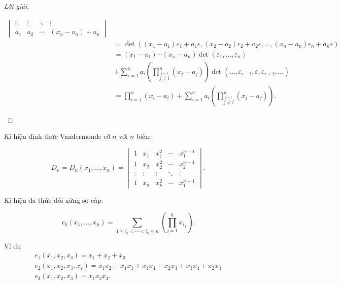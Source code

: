 \documentclass[class=nhvh-linear-algebra,crop=false]{standalone}
\begin{document}
\begin{proof}[Lời giải]
\begin{enumerate}[label = (\alph*)]
\begin{align*}
\begin{vmatrix}
				      \vdots                  & \vdots                  & \ddots & \vdots                  \\
				      a_{1}                   & a_{2}                   & \cdots & (x_{n} - a_{n}) + a_{n}
			      \end{vmatrix}                                                                                       \\
			       & = \det((x_{1} - a_{1})\varepsilon_{1} + a_{1}\varepsilon, (x_{2} - a_{2})\varepsilon_{2} + a_{2}\varepsilon, \ldots, (x_{n} - a_{n})\varepsilon_{n} + a_{n}\varepsilon) \\
			       & = (x_{1} - a_{1})\cdots (x_{n} - a_{n})\det(\varepsilon_{1}, \ldots, \varepsilon_{n})                                                                                   \\
			       & + \sum^{n}_{i = 1}a_{i}\left(\prod^{n}_{\stackrel{j=1}{j\ne i}}(x_{j} - a_{j})\right)\det(\ldots, \varepsilon_{i-1}, \varepsilon, \varepsilon_{i+1}, \ldots)            \\
			       & = \prod^{n}_{i=1}(x_{i} - a_{i}) + \sum^{n}_{i=1}a_{i}\left(\prod^{n}_{\stackrel{j=1}{j\ne i}}(x_{j} - a_{j})\right).
		      \end{align*}
	\end{enumerate}
\end{proof}

\par Kí hiệu định thức Vandermonde cỡ $n$ với $n$ biến:

\[
	D_{n} = D_{n}(x_{1}, \ldots, x_{n}) =
	\begin{vmatrix}
		1      & x_{1}  & x_{1}^{2} & \cdots & x_{1}^{n-1} \\
		1      & x_{2}  & x_{2}^{2} & \cdots & x_{2}^{n-1} \\
		\vdots & \vdots & \vdots    & \ddots & \vdots      \\
		1      & x_{n}  & x_{n}^{2} & \cdots & x_{1}^{n-1}
	\end{vmatrix}.
\]

\par Kí hiệu đa thức đối xứng sơ cấp:

\[
	e_{k}(x_{1}, \ldots, x_{n}) = \sum_{1\le i_{1} < \cdots < i_{k} \le n}\left(\prod^{k}_{j=1}x_{i_{j}}\right).
\]

\par Ví dụ
\begin{gather*}
	e_{1}(x_{1}, x_{2}, x_{3}) = x_{1} + x_{2} + x_{3} \\
	e_{2}(x_{1}, x_{2}, x_{3}, x_{4}) = x_{1}x_{2} + x_{1}x_{3} + x_{1}x_{4} + x_{2}x_{3} + x_{3}x_{4} + x_{2}x_{4} \\
	e_{3}(x_{1}, x_{2}, x_{3}) = x_{1}x_{2}x_{3}.
\end{gather*}
\end{document}
